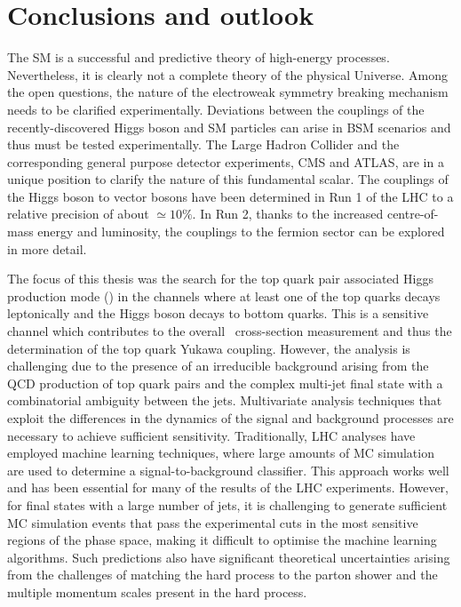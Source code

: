 \chapter{Conclusions and outlook}
\label{sec:outlook}
The SM is a successful and predictive theory of high-energy processes. Nevertheless, it is clearly not a complete theory of the physical Universe. Among the open questions, the nature of the electroweak symmetry breaking mechanism needs to be clarified experimentally. Deviations between the couplings of the recently-discovered Higgs boson and SM particles can arise in BSM scenarios and thus must be tested experimentally. The Large Hadron Collider and the corresponding general purpose detector experiments, CMS and ATLAS, are in a unique position to clarify the nature of this fundamental scalar. The couplings of the Higgs boson to vector bosons have been determined in Run 1 of the LHC to a relative precision of about $\simeq10\%$. In Run 2, thanks to the increased centre-of-mass energy and luminosity, the couplings to the fermion sector can be explored in more detail.

The focus of this thesis was the search for the top quark pair associated Higgs production mode (\ttH) in the channels where at least one of the top quarks decays leptonically and the Higgs boson decays to bottom quarks. This is a sensitive channel which contributes to the overall \ttH~cross-section measurement and thus the determination of the top quark Yukawa coupling. However, the analysis is challenging due to the presence of an irreducible background arising from the QCD production of top quark pairs and the complex multi-jet final state with a combinatorial ambiguity between the jets. Multivariate analysis techniques that exploit the differences in the dynamics of the signal and background processes are necessary to achieve sufficient sensitivity. Traditionally, LHC analyses have employed machine learning techniques, where large amounts of MC simulation are used to determine a signal-to-background classifier. This approach works well and has been essential for many of the results of the LHC experiments. However, for final states with a large number of jets, it is challenging to generate sufficient MC simulation events that pass the experimental cuts in the most sensitive regions of the phase space, making it difficult to optimise the machine learning algorithms. Such predictions also have significant theoretical uncertainties arising from the challenges of matching the hard process to the parton shower and the multiple momentum scales present in the hard process.

